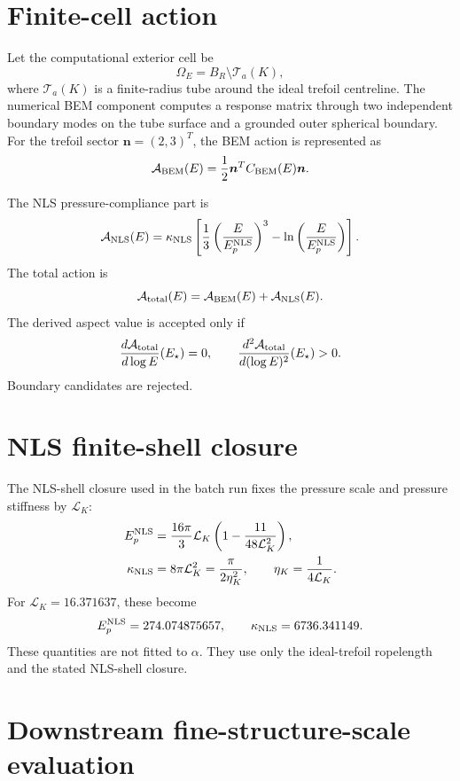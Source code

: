 \documentclass[11pt]{article}
\newcommand{\LK}{\mathcal L_K}
\newcommand{\Estar}{E_\star}
\newcommand{\Tube}{\mathcal T_a(K)}
\newcommand{\OmegaE}{\Omega_E}
\begin{document}
\section{Finite-cell action}

Let the computational exterior cell be
\[
\OmegaE=B_R\setminus \Tube,
\]
where \(\Tube\) is a finite-radius tube around the ideal trefoil centreline. The numerical BEM component computes a response matrix through two independent boundary modes on the tube surface and a grounded outer spherical boundary. For the trefoil sector \(\bm n=(2,3)^T\), the BEM action is represented as
\[
\mathcal A_{\rm BEM}(E)=\frac12\bm n^T C_{\rm BEM}(E)\bm n.
\]

The NLS pressure-compliance part is
\begin{equation}
\mathcal A_{\rm NLS}(E)
=
\kappa_{\rm NLS}
\left[
\frac13\left(\frac{E}{E_p^{\rm NLS}}\right)^3
-
\ln\left(\frac{E}{E_p^{\rm NLS}}\right)
\right].
\label{eq:nls-action}
\end{equation}
The total action is
\begin{equation}
\mathcal A_{\rm total}(E)
=
\mathcal A_{\rm BEM}(E)+\mathcal A_{\rm NLS}(E).
\label{eq:total-action}
\end{equation}
The derived aspect value is accepted only if
\begin{equation}
\frac{d\mathcal A_{\rm total}}{d\log E}(\Estar)=0,
\qquad
\frac{d^2\mathcal A_{\rm total}}{d(\log E)^2}(\Estar)>0.
\label{eq:stationarity}
\end{equation}
Boundary candidates are rejected.

\section{NLS finite-shell closure}

The NLS-shell closure used in the batch run fixes the pressure scale and pressure stiffness by \(\LK\):
\begin{align}
E_p^{\rm NLS}
&=
\frac{16\pi}{3}\LK
\left(1-\frac{11}{48\LK^2}\right),
\label{eq:Ep}\\
\kappa_{\rm NLS}
&=8\pi\LK^2
=\frac{\pi}{2\eta_K^2},
\qquad
\eta_K=\frac{1}{4\LK}.
\label{eq:kappa}
\end{align}
For \(\LK=16.371637\), these become
\[
E_p^{\rm NLS}=274.074875657,
\qquad
\kappa_{\rm NLS}=6736.341149.
\]
These quantities are not fitted to \(\alpha\). They use only the ideal-trefoil ropelength and the stated NLS-shell closure.

\section{Downstream fine-structure-scale evaluation}
\end{document}
